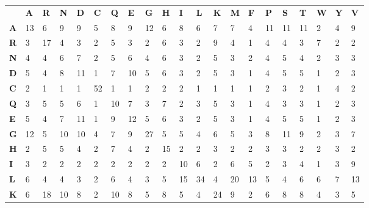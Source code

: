 \begin{table}[!ht]
\footnotesize
\centering

\label{my-label}
\begin{tabular}{lllllllllllllllllllll}
   & \textbf{A }  & \textbf{R}   & \textbf{N}   & \textbf{D }  & \textbf{C}   & \textbf{Q}   & \textbf{E}   & \textbf{G}   & \textbf{H }  & \textbf{I}   & \textbf{L}   & \textbf{K}   & \textbf{M}   & \textbf{F}   & \textbf{P}   & \textbf{S}   & \textbf{T}   & \textbf{W}   & \textbf{Y}   & \textbf{V}   \\
\textbf{A} & 13  & 6   & 9   & 9   & 5   & 8   & 9   & 12  & 6   & 8   & 6   & 7   & 7   & 4   & 11  & 11  & 11  & 2   & 4   & 9   \\
\textbf{R} & 3   & 17  & 4   & 3   & 2   & 5   & 3   & 2   & 6   & 3   & 2   & 9   & 4   & 1   & 4   & 4   & 3   & 7   & 2   & 2   \\
\textbf{N} & 4   & 4   & 6   & 7   & 2   & 5   & 6   & 4   & 6   & 3   & 2   & 5   & 3   & 2   & 4   & 5   & 4   & 2   & 3   & 3   \\
\textbf{D} & 5   & 4   & 8   & 11  & 1   & 7   & 10  & 5   & 6   & 3   & 2   & 5   & 3   & 1   & 4   & 5   & 5   & 1   & 2   & 3   \\
\textbf{C} & 2   & 1   & 1   & 1   & 52  & 1   & 1   & 2   & 2   & 2   & 1   & 1   & 1   & 1   & 2   & 3   & 2   & 1   & 4   & 2   \\
\textbf{Q} & 3   & 5   & 5   & 6   & 1   & 10  & 7   & 3   & 7   & 2   & 3   & 5   & 3   & 1   & 4   & 3   & 3   & 1   & 2   & 3   \\
\textbf{E }& 5   & 4   & 7   & 11  & 1   & 9   & 12  & 5   & 6   & 3   & 2   & 5   & 3   & 1   & 4   & 5   & 5   & 1   & 2   & 3   \\
\textbf{G} & 12  & 5   & 10  & 10  & 4   & 7   & 9   & 27  & 5   & 5   & 4   & 6   & 5   & 3   & 8   & 11  & 9   & 2   & 3   & 7   \\
\textbf{H} & 2   & 5   & 5   & 4   & 2   & 7   & 4   & 2   & 15  & 2   & 2   & 3   & 2   & 2   & 3   & 3   & 2   & 2   & 3   & 2   \\
\textbf{I }& 3   & 2   & 2   & 2   & 2   & 2   & 2   & 2   & 2   & 10  & 6   & 2   & 6   & 5   & 2   & 3   & 4   & 1   & 3   & 9   \\
\textbf{L} & 6   & 4   & 4   & 3   & 2   & 6   & 4   & 3   & 5   & 15  & 34  & 4   & 20  & 13  & 5   & 4   & 6   & 6   & 7   & 13  \\
\textbf{K} & 6   & 18  & 10  & 8   & 2   & 10  & 8   & 5   & 8   & 5   & 4   & 24  & 9   & 2   & 6   & 8   & 8   & 4   & 3   & 5   \\

\end{tabular}
\end{table}
